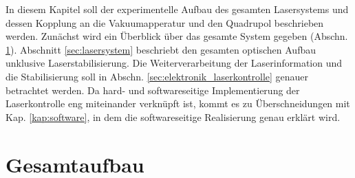 In diesem Kapitel soll der experimentelle Aufbau des gesamten Lasersystems und
dessen Kopplung an die Vakuumapperatur und den Quadrupol beschrieben werden.
Zunächst wird ein Überblick über das gesamte System gegeben (Abschn.
\ref{sec:gesamtaufbau}). Abschnitt \ref{sec:lasersystem} beschriebt den gesamten
optischen Aufbau unklusive Laserstabilisierung. Die Weiterverarbeitung der
Laserinformation und die Stabilisierung soll in Abschn.
\ref{sec:elektronik_laserkontrolle} genauer betrachtet werden. Da hard- und
softwareseitige Implementierung der Laserkontrolle eng miteinander verknüpft
ist, kommt es zu Überschneidungen mit Kap. \ref{kap:software}, in dem die
softwareseitige Realisierung genau erklärt wird.

\section{Gesamtaufbau}\label{sec:gesamtaufbau}
